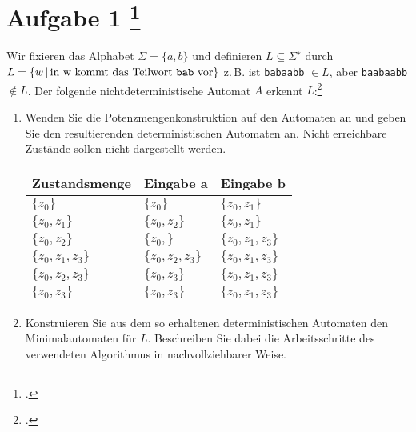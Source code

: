 \documentclass{lehramt-informatik-aufgabe}
\begin{document}
\section{Aufgabe 1
\footcite{theoinf:ab:1}}

Wir fixieren das Alphabet $\Sigma = \{a, b\}$ und definieren $L
\subseteq \Sigma^∗$ durch $L = \{ w \,|\, \text{in w kommt das Teilwort
\texttt{bab} vor} \}$ z.\,B. ist \texttt{babaabb} $\in L$, aber
\texttt{baabaabb} $\notin L$. Der folgende nichtdeterministische
Automat $A$ erkennt $L$:\footcite{examen:66115:2012:09}

\begin{center}
\end{center}

\begin{enumerate}
\item Wenden Sie die Potenzmengenkonstruktion auf den Automaten an und
geben Sie den resultierenden deterministischen Automaten an. Nicht
erreichbare Zustände sollen nicht dargestellt werden.

\begin{tabular}{l|l|l}

Zustandsmenge & Eingabe a & Eingabe b \\\hline

$\{z_0 \}$ & $\{z_0 \}$ & $\{z_0, z_1 \}$ \\

$\{z_0, z_1 \}$ & $\{z_0, z_2 \}$ & $\{z_0, z_1 \}$ \\

$\{z_0, z_2 \}$ & $\{z_0, \}$ & $\{z_0, z_1, z_3 \}$ \\

$\{z_0, z_1, z_3 \}$ & $\{z_0, z_2, z_3 \}$ & $\{z_0, z_1, z_3 \}$ \\

$\{z_0, z_2, z_3 \}$ & $\{z_0, z_3 \}$ &  $\{z_0, z_1, z_3 \}$ \\

$\{z_0, z_3 \}$ & $\{z_0, z_3 \}$ & $\{z_0, z_1, z_3 \}$\\

\end{tabular}

\item Konstruieren Sie aus dem so erhaltenen deterministischen Automaten
den Minimalautomaten für $L$. Beschreiben Sie dabei die Arbeitsschritte
des verwendeten Algorithmus in nachvollziehbarer Weise.
\end{enumerate}
\end{document}
